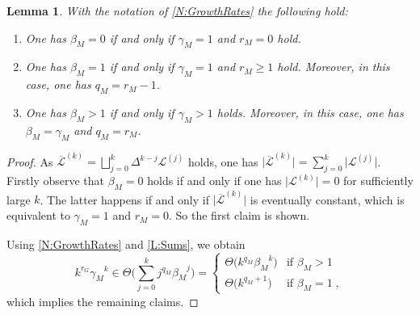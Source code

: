 \documentclass[a4paper,final]{article}
\let\ge\geqslant
\theoremstyle{plain}
\newtheorem{lemma}[lemma]{Lemma}
\theoremstyle{remark}
\theoremstyle{definition}
\begin{document}
\begin{lemma}\label{L:GrowthRates}
With the notation of \autoref{N:GrowthRates} the following hold:
\begin{enumerate} \itemsep 0em \vspace{-0.5\topskip}
\item One has $\beta_M=0$ if and only if $\gamma_M=1$ and $r_M=0$ hold.
\item One has $\beta_M=1$ if and only if $\gamma_M=1$ and $r_M\ge1$ hold.
      Moreover, in this case, one has $q_M=r_M-1$.
\item One has $\beta_M>1$ if and only if $\gamma_M>1$ holds.
      Moreover, in this case, one has $\beta_M=\gamma_M$ and $q_M=r_M$.
\end{enumerate}
\end{lemma}
\begin{proof}
As ${\overline{\mathcal{L}}}^{(k)} = \bigsqcup_{j=0}^k \Delta^{k-j} {\mathcal{L}}^{(j)}$ holds, one has
$\Big|{\overline{\mathcal{L}}}^{(k)}\Big| = \sum_{j=0}^k \big|{\mathcal{L}}^{(j)}\big|$.
Firstly observe that $\beta_M=0$ holds if and only if one has $\big|{\mathcal{L}}^{(k)}\big|=0$ for sufficiently large $k$.  The latter happens if and only if $\Big|{\overline{\mathcal{L}}}^{(k)}\Big|$ is eventually constant, which is equivalent to $\gamma_M=1$ and $r_M=0$.  So the first claim is shown.

Using \autoref{N:GrowthRates} and \autoref{L:Sums}, we obtain
\[
  k^{r_G} {\gamma_M}^k \in \Theta\Bigg( \sum_{j=0}^k j^{q_M} {\beta_M}^j \Bigg)
    = \begin{cases}
       \Theta\big( k^{q_M} {\beta_M}^k \big) & \text{if $\beta_M>1$} \\[1.0ex]
       \Theta\big( k^{q_M+1} \big)         & \text{if $\beta_M=1$} \;,
      \end{cases}
\]
which implies the remaining claims.
\end{proof}
\end{document}
